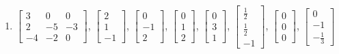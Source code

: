 \begin{exercise}
\begin{enumerate}
\item \(\begin{bmatrix} 3&0&0\\2&-5&-3\\-4&-2&0 \end{bmatrix}\),\quad
\(\begin{bmatrix}2\\1\\-1\end{bmatrix}\), \(\begin{bmatrix}0\\-1\\2\end{bmatrix}\), \(\begin{bmatrix}0\\1\\2\end{bmatrix}\), \(\begin{bmatrix}0\\3\\1\end{bmatrix}\), \(\begin{bmatrix}\frac12\\\frac12\\-1\end{bmatrix}\), \(\begin{bmatrix}0\\0\\0\end{bmatrix}\), \(\begin{bmatrix}0\\-1\\-\frac13\end{bmatrix}\)


\end{enumerate}
\end{exercise}
